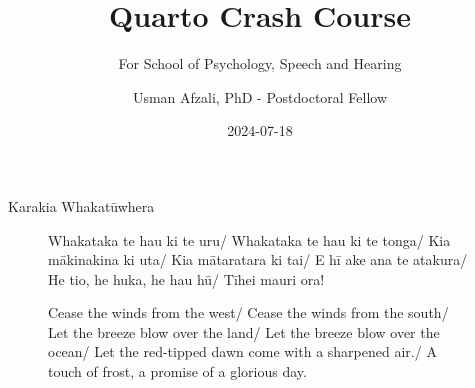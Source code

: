 \documentclass[
  ignorenonframetext,
  aspectratio=169,
]{beamer}
\title{Quarto Crash Course}
\subtitle{For School of Psychology, Speech and Hearing}
\author{Usman Afzali, PhD - Postdoctoral Fellow}
\date{2024-07-18}
\institute{University of Canterbury}
\begin{document}
\frame{\titlepage}

\begin{frame}
\begin{block}{Karakia Whakatūwhera}
\label{karakia-whakatux16bwhera}
\begin{figure}

\begin{minipage}{0.50\linewidth}
Whakataka te hau ki te uru/ Whakataka te hau ki te tonga/ Kia mākinakina
ki uta/ Kia mātaratara ki tai/ E hī ake ana te atakura/ He tio, he huka,
he hau hū/ Tīhei mauri ora!\end{minipage}%
%
\begin{minipage}{0.50\linewidth}
Cease the winds from the west/ Cease the winds from the south/ Let the
breeze blow over the land/ Let the breeze blow over the ocean/ Let the
red-tipped dawn come with a sharpened air./ A touch of frost, a promise
of a glorious day.\end{minipage}%

\end{figure}%
\end{block}
\end{frame}
\end{document}
